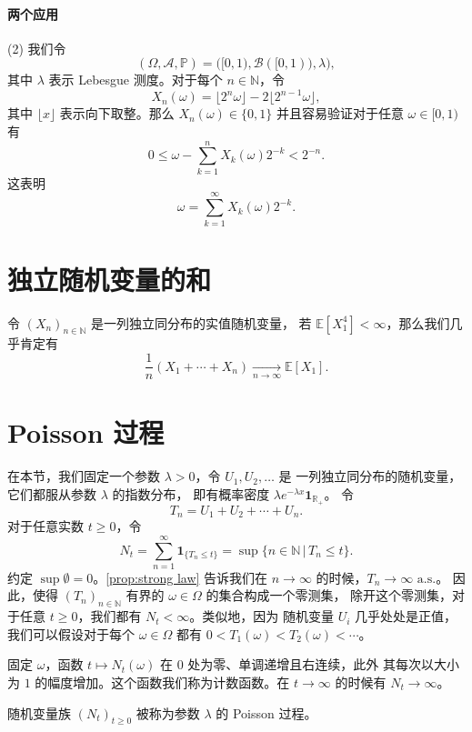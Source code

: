 \documentclass[fontset=none]{Notes}
\newcommand{\indicator}[1]{\mathbold 1_{#1}}
\newcommand{\alsu}[1]{\text{$#1$ a.s.}}
\begin{document}
\paragraph{两个应用}
(2) 我们令
\[
  (\Omega,\mathcal{A},\mathbb{P})=\bigl([0,1),\mathcal{B}([0,1)),\lambda\bigr) ,
\]
其中 $\lambda$ 表示 Lebesgue 测度。对于每个 $n\in \mathbb{N}$，令
\[
  X_n(\omega)=\lfloor 2^n\omega\rfloor-2\lfloor 2^{n-1}\omega\rfloor,
\]
其中 $\lfloor x\rfloor$ 表示向下取整。那么 $X_n(\omega)\in\{0,1\}$
并且容易验证对于任意 $\omega\in [0,1)$ 有
\[
  0\leq\omega-\sum_{k=1}^nX_k(\omega)2^{-k}<2^{-n}.  
\]
这表明
\[
  \omega=\sum_{k=1}^\infty X_k(\omega)2^{-k}.  
\]

\section{独立随机变量的和}

\begin{proposition}[强大数定律]\label{prop:strong law}
  令 $(X_n)_{n\in \mathbb{N}}$ 是一列独立同分布的实值随机变量，
  若 $\mathbb{E}[X_1^4]<\infty$，那么我们几乎肯定有
  \[
    \frac{1}{n}(X_1+\cdots+X_n)\xrightarrow[n\to\infty]{} \mathbb{E}[X_1].
  \]
\end{proposition}


\section{Poisson 过程}\label{sec:poisson}

在本节，我们固定一个参数 $\lambda>0$，令 $U_1,U_2,\dots$ 是
一列独立同分布的随机变量，它们都服从参数 $\lambda$ 的指数分布，
即有概率密度 $\lambda e^{-\lambda x}\indicator{\mathbb{R}_+}$。
令
\[
  T_n=U_1+U_2+\cdots+U_n.  
\]
对于任意实数 $t\geq 0$，令
\[
  N_t=\sum_{n=1}^\infty \indicator{\{T_n\leq t\}}=\sup\{n\in \mathbb{N}\,|\,T_n\leq t\}  .
\]
约定 $\sup\emptyset =0 $。\autoref{prop:strong law}
告诉我们在 $n\to\infty$ 的时候，$T_n\to\infty \alsu{}$。
因此，使得 $(T_n)_{n\in \mathbb{N}}$ 有界的 $\omega\in\Omega$ 的集合构成一个零测集，
除开这个零测集，对于任意 $t\geq 0$，我们都有 $N_t<\infty$。类似地，因为
随机变量 $U_i$ 几乎处处是正值，我们可以假设对于每个 $\omega\in\Omega$ 都有
$0<T_1(\omega)<T_2(\omega)<\cdots$。

固定 $\omega$，函数 $t\mapsto N_t(\omega)$ 在 $0$ 处为零、单调递增且右连续，此外
其每次以大小为 $1$ 的幅度增加。这个函数我们称为计数函数。在 $t\to\infty$
的时候有 $N_t\to\infty$。

\begin{definition}
  随机变量族 $(N_t)_{t\geq 0}$ 被称为参数 $\lambda$ 的 Poisson 过程。
\end{definition}
\end{document}
